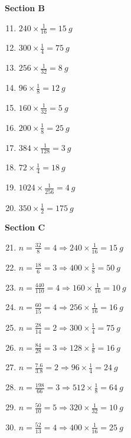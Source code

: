 \documentclass[12pt]{article}
\begin{document}
\textbf{Section B}
\begin{enumerate}
\setcounter{enumi}{10}
\item \(240\times\tfrac{1}{16}=\SI{15}{g}\)
\item \(300\times\tfrac{1}{4}=\SI{75}{g}\)
\item \(256\times\tfrac{1}{32}=\SI{8}{g}\)
\item \(96\times\tfrac{1}{8}=\SI{12}{g}\)
\item \(160\times\tfrac{1}{32}=\SI{5}{g}\)
\item \(200\times\tfrac{1}{8}=\SI{25}{g}\)
\item \(384\times\tfrac{1}{128}=\SI{3}{g}\)
\item \(72\times\tfrac{1}{4}=\SI{18}{g}\)
\item \(1024\times\tfrac{1}{256}=\SI{4}{g}\)
\item \(350\times\tfrac{1}{2}=\SI{175}{g}\)
\end{enumerate}

\textbf{Section C}
\begin{enumerate}
\setcounter{enumi}{20}
\item \(n=\tfrac{32}{8}=4\Rightarrow 240\times\tfrac{1}{16}=\SI{15}{g}\)
\item \(n=\tfrac{18}{6}=3\Rightarrow 400\times\tfrac{1}{8}=\SI{50}{g}\)
\item \(n=\tfrac{440}{110}=4\Rightarrow 160\times\tfrac{1}{16}=\SI{10}{g}\)
\item \(n=\tfrac{60}{15}=4\Rightarrow 256\times\tfrac{1}{16}=\SI{16}{g}\)
\item \(n=\tfrac{28}{14}=2\Rightarrow 300\times\tfrac{1}{4}=\SI{75}{g}\)
\item \(n=\tfrac{84}{28}=3\Rightarrow 128\times\tfrac{1}{8}=\SI{16}{g}\)
\item \(n=\tfrac{7.6}{3.8}=2\Rightarrow 96\times\tfrac{1}{4}=\SI{24}{g}\)
\item \(n=\tfrac{198}{66}=3\Rightarrow 512\times\tfrac{1}{8}=\SI{64}{g}\)
\item \(n=\tfrac{50}{10}=5\Rightarrow 320\times\tfrac{1}{32}=\SI{10}{g}\)
\item \(n=\tfrac{52}{13}=4\Rightarrow 400\times\tfrac{1}{16}=\SI{25}{g}\)
\end{enumerate}
\end{document}
